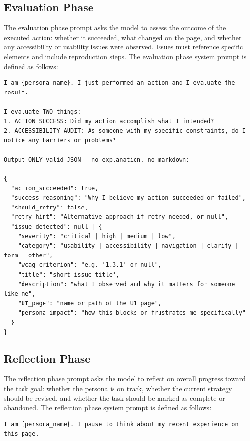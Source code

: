 \begin{itemize}
\subsection{Evaluation Phase}

The evaluation phase prompt asks the model to assess the outcome of the executed action: whether it succeeded, what changed on the page, and whether any accessibility or usability issues were observed. Issues must reference specific elements and include reproduction steps. The evaluation phase system prompt is defined as follows:

\begin{lstlisting}[caption={Persona Agent Evaluation Phase system prompt excerpt (from \filepath{prompts/persona\_prompts.py}).}, label={lst:persona-evaluate-prompt}]
I am {persona_name}. I just performed an action and I evaluate the result.

I evaluate TWO things:
1. ACTION SUCCESS: Did my action accomplish what I intended?
2. ACCESSIBILITY AUDIT: As someone with my specific constraints, do I notice any barriers or problems?

Output ONLY valid JSON - no explanation, no markdown:

{
  "action_succeeded": true,
  "success_reasoning": "Why I believe my action succeeded or failed",
  "should_retry": false,
  "retry_hint": "Alternative approach if retry needed, or null",
  "issue_detected": null | {
    "severity": "critical | high | medium | low",
    "category": "usability | accessibility | navigation | clarity | form | other",
    "wcag_criterion": "e.g. '1.3.1' or null",
    "title": "short issue title",
    "description": "what I observed and why it matters for someone like me",
    "UI_page": "name or path of the UI page",
    "persona_impact": "how this blocks or frustrates me specifically"
  }
}
\end{lstlisting}

\subsection{Reflection Phase}

The reflection phase prompt asks the model to reflect on overall progress toward the task goal: whether the persona is on track, whether the current strategy should be revised, and whether the task should be marked as complete or abandoned. The reflection phase system prompt is defined as follows:

\begin{lstlisting}[caption={Persona Agent Reflection Phase system prompt excerpt (from \filepath{prompts/persona\_prompts.py}).}, label={lst:persona-reflect-prompt}]
I am {persona_name}. I pause to think about my recent experience on this page.


\end{lstlisting}
\end{itemize}
